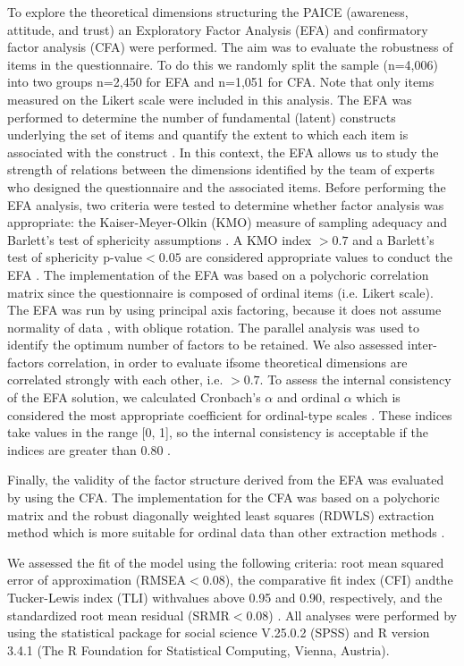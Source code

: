 \documentclass{article}
\begin{document}
To explore the theoretical dimensions structuring the PAICE (awareness, attitude, and trust) an Exploratory Factor Analysis (EFA) and confirmatory factor analysis (CFA) were performed. The aim was to evaluate the robustness of items in the questionnaire. To do this we randomly split the sample (n=4,006) into two groups n=2,450 for EFA and n=1,051 for CFA.
Note that only items measured on the Likert scale were included in this analysis. 
The EFA was performed to determine the number of fundamental (latent) constructs underlying the set of items and quantify the extent to which each item is associated with the construct \cite{Tinsley2020}. 
In this context, the EFA allows us to study the strength of relations between the dimensions identified by the team of experts who designed the questionnaire and the associated items. 
Before performing the EFA analysis, two criteria were tested to determine whether factor analysis was appropriate: the Kaiser-Meyer-Olkin (KMO) measure of sampling adequacy and Barlett's test of sphericity assumptions \cite{Kaiser1974, Fabrigar1999}. 
A KMO index $>0.7$ and a Barlett's test of sphericity p-value$<0.05$ are considered appropriate values to conduct the EFA \cite{Kaiser1974,Fabrigar1999}. The implementation of the EFA was based on a polychoric correlation matrix since the questionnaire is composed of ordinal items (i.e. Likert scale). The EFA was run by using principal axis factoring, because it does not assume normality of data \cite{Brown2015}, with oblique rotation. The parallel analysis was used to identify the optimum number of factors to be retained. We also assessed inter-factors correlation, in order to evaluate ifsome theoretical dimensions are correlated strongly with each other, i.e. $>0.7$.
To assess the internal consistency of the EFA solution, we calculated Cronbach’s $\alpha$ and ordinal $\alpha$ which is considered the most appropriate coefficient for ordinal-type scales \cite{Gadermann2012, Zumbo2007}. These indices take values in the range [0, 1], so the internal consistency is acceptable if the indices are greater than 0.80 \cite{nunnally1994}. 

Finally, the validity of the factor structure derived from the EFA was evaluated by using the CFA. The implementation for the CFA was based on a polychoric matrix and the robust diagonally weighted least squares (RDWLS) extraction method which is more suitable for ordinal data than other extraction methods \cite{ch2016}. 
 
We assessed the fit of the model using the following criteria: root mean squared error of approximation (RMSEA$<0.08$), the comparative fit index (CFI) andthe Tucker-Lewis index (TLI) withvalues above 0.95 and 0.90, respectively, and the standardized root mean residual (SRMR$ <0.08$) \cite{Taasoobshirazi2016}. 
All analyses were performed by using the statistical package for social science V.25.0.2 (SPSS) and R version 3.4.1 (The R Foundation for Statistical Computing, Vienna, Austria).
\end{document}
